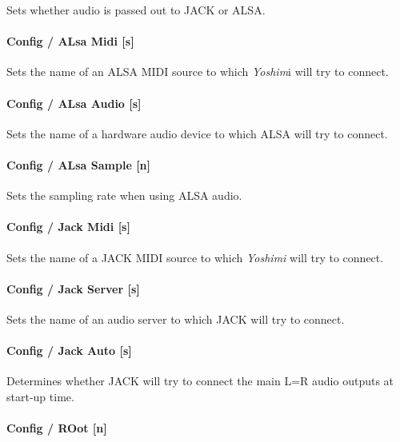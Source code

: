    Sets whether audio is passed out to JACK or ALSA.

\paragraph{Config / ALsa Midi [s]}
\label{paragraph:command_line_config_alsa_midi}

   Sets the name of an ALSA MIDI source to which
   \textsl{Yoshim}i will try to connect.

\paragraph{Config / ALsa Audio [s]}
\label{paragraph:command_line_config_alsa_audio}

   Sets the name of a hardware audio device to which ALSA will try to connect.

\paragraph{Config / ALsa Sample [n]}
\label{paragraph:command_line_config_alsa_sample}

   Sets the sampling rate when using ALSA audio.

\paragraph{Config / Jack Midi [s]}
\label{paragraph:command_line_config_jack_midi}

   Sets the name of a JACK MIDI source to which
   \textsl{Yoshimi} will try to connect.

\paragraph{Config / Jack Server [s]}
\label{paragraph:command_line_config_jack_server}

   Sets the name of an audio server to which JACK will try to connect.

\paragraph{Config / Jack Auto [s]}
\label{paragraph:command_line_config_jack_auto}

   Determines whether JACK will try to connect the main L=R audio outputs at
   start-up time.

\paragraph{Config / ROot [n]}
\label{paragraph:command_line_config_root}

